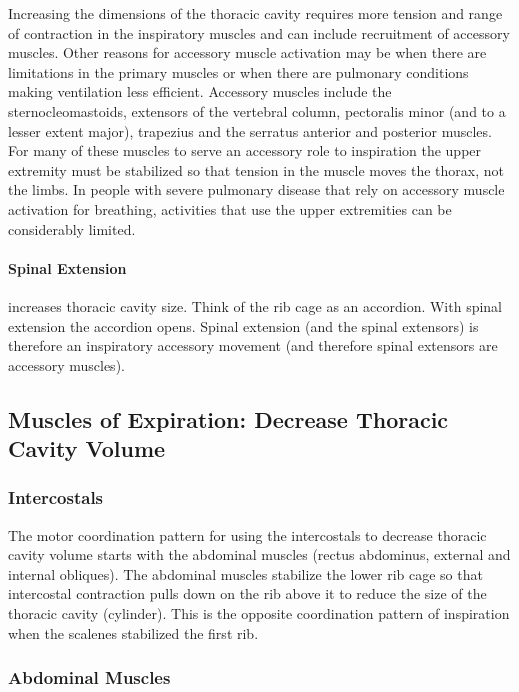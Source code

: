 Increasing the dimensions of the thoracic cavity requires more tension and range of contraction in the inspiratory muscles and can include recruitment of accessory muscles. Other reasons for accessory muscle activation may be when there are limitations in the primary muscles or when there are pulmonary conditions making ventilation less efficient. Accessory muscles include the sternocleomastoids, extensors of the vertebral column, pectoralis minor (and to a lesser extent major), trapezius and the serratus anterior and posterior muscles. For many of these muscles to serve an accessory role to inspiration the upper extremity must be stabilized so that tension in the muscle moves the thorax, not the limbs. In people with severe pulmonary disease that rely on accessory muscle activation for breathing, activities that use the upper extremities can be considerably limited.

\paragraph{Spinal Extension} increases thoracic cavity size. Think of the rib cage as an accordion. With spinal extension the accordion opens. Spinal extension (and the spinal extensors) is therefore an inspiratory accessory movement (and therefore spinal extensors are accessory muscles).


\subsection{Muscles of Expiration: Decrease Thoracic Cavity Volume}

\subsubsection{Intercostals}

The motor coordination pattern for using the intercostals to decrease thoracic cavity volume starts with the abdominal muscles (rectus abdominus, external and internal obliques). The abdominal muscles stabilize the lower rib cage so that intercostal contraction pulls down on the rib above it to reduce the size of the thoracic cavity (cylinder). This is the opposite coordination pattern of inspiration when the scalenes stabilized the first rib. 

\subsubsection{Abdominal Muscles}

